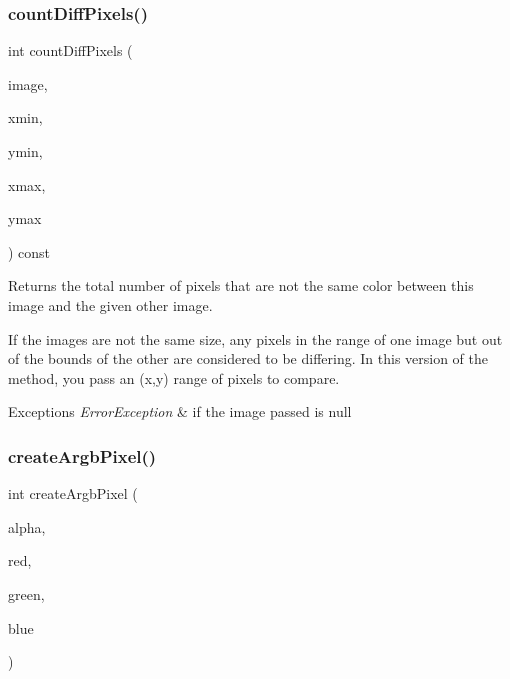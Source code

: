 \subsubsection{\texorpdfstring{count\+Diff\+Pixels()}{countDiffPixels()}\hspace{0.1cm}{\footnotesize\ttfamily [4/4]}}
{\footnotesize\ttfamily int count\+Diff\+Pixels (\begin{DoxyParamCaption}\item[{const \mbox{\hyperlink{classGCanvas}{G\+Canvas}} $\ast$}]{image,  }\item[{int}]{xmin,  }\item[{int}]{ymin,  }\item[{int}]{xmax,  }\item[{int}]{ymax }\end{DoxyParamCaption}) const\hspace{0.3cm}{\ttfamily [virtual]}}



Returns the total number of pixels that are not the same color between this image and the given other image. 

If the images are not the same size, any pixels in the range of one image but out of the bounds of the other are considered to be differing. In this version of the method, you pass an (x,y) range of pixels to compare. 
\begin{DoxyExceptions}{Exceptions}
{\em Error\+Exception} & if the image passed is null \\
\hline
\end{DoxyExceptions}
\mbox{\label{classGCanvas_a5ef799a28166a7f009365102168a2d06}} 
\subsubsection{\texorpdfstring{create\+Argb\+Pixel()}{createArgbPixel()}}
{\footnotesize\ttfamily int create\+Argb\+Pixel (\begin{DoxyParamCaption}\item[{int}]{alpha,  }\item[{int}]{red,  }\item[{int}]{green,  }\item[{int}]{blue }\end{DoxyParamCaption})\hspace{0.3cm}{\ttfamily [static]}}




